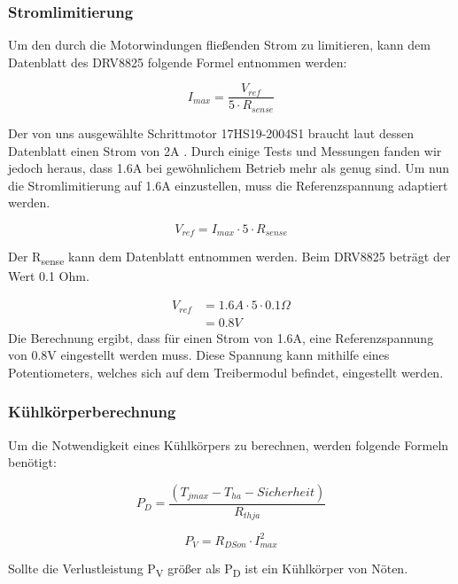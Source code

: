 \subsubsection{Stromlimitierung}
Um den durch die Motorwindungen fließenden Strom zu limitieren, kann dem Datenblatt des DRV8825 folgende Formel entnommen werden:

\begin{equation}
    I_{max} = \frac{V_{ref}} {5 \cdot R_{sense}}
\end{equation}

Der von uns ausgewählte Schrittmotor 17HS19-2004S1 braucht laut dessen Datenblatt einen Strom von 2A .
Durch einige Tests und Messungen fanden wir jedoch heraus, dass 1.6A bei gewöhnlichem Betrieb mehr als genug sind.
Um nun die Stromlimitierung auf 1.6A einzustellen, muss die Referenzspannung adaptiert werden.

\begin{equation*}
    V_{ref} = I_{max} \cdot 5 \cdot R_{sense}
\end{equation*}

Der R\textsubscript{sense} kann dem Datenblatt entnommen werden.
Beim DRV8825 beträgt der Wert 0.1 Ohm.

\begin{align*}
    V_{ref} &= 1.6A \cdot 5 \cdot 0.1\Omega \\
    &= 0.8V
\end{align*}
Die Berechnung ergibt, dass für einen Strom von 1.6A, eine Referenzspannung von 0.8V eingestellt werden muss.
Diese Spannung kann mithilfe eines Potentiometers, welches sich auf dem Treibermodul befindet, eingestellt werden.

\subsubsection{Kühlkörperberechnung}
Um die Notwendigkeit eines Kühlkörpers zu berechnen, werden folgende Formeln benötigt:

\begin{equation}
    P_D = \frac{(T_{jmax} - T_{ha} - Sicherheit)}{R_{thja}}
\end{equation}

\begin{equation}
    P_V = R_{DSon} \cdot I_{max}^2
\end{equation}

Sollte die Verlustleistung P\textsubscript{V} größer als P\textsubscript{D} ist ein Kühlkörper von Nöten. \\

